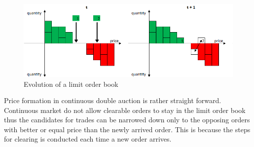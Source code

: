 \begin{figure}
    \begin{center}  
        \includegraphics[width=15cm]{diagrams/lob_evolution.png}
        \caption{Evolution of a limit order book}
        \label{fig:lob_evo}
    \end{center}
\end{figure}

Price formation in continuous double auction is rather straight forward. Continuous
market do not allow clearable orders to stay in the limit order book thus the
candidates for trades can be narrowed down only to the opposing orders with better
or equal price than the newly arrived order. This is because the steps for 
clearing is conducted each time a new order arrives.



